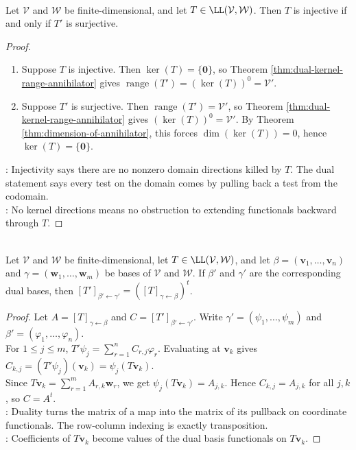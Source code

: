 \begin{corollary} \label{cor:injective-iff-dual-surjective} \\
Let $\mathcal{V}$ and $\mathcal{W}$ be finite-dimensional, and let $T\in\LL(\mathcal{V},\mathcal{W})$. Then $T$ is injective if and only if $T'$ is surjective.
\begin{proof}
\begin{enumerate}[label=\roman*.]
\setlength{\itemsep}{0pt}
\item[$(\Rightarrow)$] Suppose $T$ is injective. Then $\ker(T)=\{\mathbf{0}\}$, so Theorem \ref{thm:dual-kernel-range-annihilator} gives $\operatorname{range}(T')=(\ker(T))^0=\mathcal{V}'$.
\item[$(\Leftarrow)$] Suppose $T'$ is surjective. Then $\operatorname{range}(T')=\mathcal{V}'$, so Theorem \ref{thm:dual-kernel-range-annihilator} gives $(\ker(T))^0=\mathcal{V}'$. By Theorem \ref{thm:dimension-of-annihilator}, this forces $\dim(\ker(T))=0$, hence $\ker(T)=\{\mathbf{0}\}$.
\end{enumerate}
: Injectivity says there are no nonzero domain directions killed by $T$. The dual statement says every test on the domain comes by pulling back a test from the codomain.\\
: No kernel directions means no obstruction to extending functionals backward through $T$.
\end{proof}
\end{corollary}

\begin{theorem} \label{thm:matrix-of-dual-map-is-transpose} \\
Let $\mathcal{V}$ and $\mathcal{W}$ be finite-dimensional, let $T\in\LL(\mathcal{V},\mathcal{W})$, and let $\beta=(\mathbf{v}_1,\ldots,\mathbf{v}_n)$ and $\gamma=(\mathbf{w}_1,\ldots,\mathbf{w}_m)$ be bases of $\mathcal{V}$ and $\mathcal{W}$. If $\beta'$ and $\gamma'$ are the corresponding dual bases, then $[T']_{\beta'\leftarrow\gamma'}=\left([T]_{\gamma\leftarrow\beta}\right)^t$.
\begin{proof}
Let $A=[T]_{\gamma\leftarrow\beta}$ and $C=[T']_{\beta'\leftarrow\gamma'}$. Write $\gamma'=(\psi_1,\ldots,\psi_m)$ and $\beta'=(\varphi_1,\ldots,\varphi_n)$.\\
For $1\leq j\leq m$, $T'\psi_j=\sum\limits_{r=1}^n C_{r,j}\varphi_r$.
Evaluating at $\mathbf{v}_k$ gives $C_{k,j}=(T'\psi_j)(\mathbf{v}_k)=\psi_j(T\mathbf{v}_k)$.\\
Since $T\mathbf{v}_k=\sum\limits_{r=1}^m A_{r,k}\mathbf{w}_r$, we get $\psi_j(T\mathbf{v}_k)=A_{j,k}$. Hence $C_{k,j}=A_{j,k}$ for all $j,k$, so $C=A^t$.\\
: Duality turns the matrix of a map into the matrix of its pullback on coordinate functionals. The row-column indexing is exactly transposition.\\
: Coefficients of $T\mathbf{v}_k$ become values of the dual basis functionals on $T\mathbf{v}_k$.
\end{proof}
\end{theorem}


